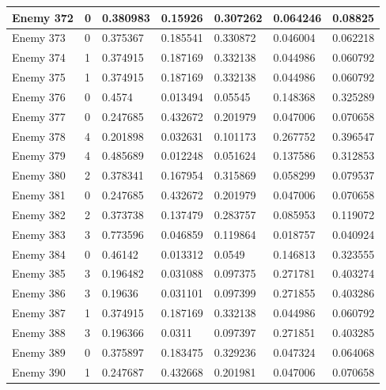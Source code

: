 \begin{longtable}{|l|l|l|l|l|l|l|}
	Enemy 372 & 0 & {\color[HTML]{009901} 0.380983} & 0.15926 & 0.307262 & 0.064246 & 0.08825 \\ \hline
	Enemy 373 & 0 & {\color[HTML]{009901} 0.375367} & 0.185541 & 0.330872 & 0.046004 & 0.062218 \\ \hline
	Enemy 374 & 1 & 0.374915 & {\color[HTML]{FE0000} 0.187169} & 0.332138 & 0.044986 & 0.060792 \\ \hline
	Enemy 375 & 1 & 0.374915 & {\color[HTML]{FE0000} 0.187169} & 0.332138 & 0.044986 & 0.060792 \\ \hline
	Enemy 376 & 0 & {\color[HTML]{009901} 0.4574} & 0.013494 & 0.05545 & 0.148368 & 0.325289 \\ \hline
	Enemy 377 & 0 & {\color[HTML]{FE0000} 0.247685} & 0.432672 & 0.201979 & 0.047006 & 0.070658 \\ \hline
	Enemy 378 & 4 & 0.201898 & 0.032631 & 0.101173 & 0.267752 & {\color[HTML]{009901} 0.396547} \\ \hline
	Enemy 379 & 4 & 0.485689 & 0.012248 & 0.051624 & 0.137586 & {\color[HTML]{FE0000} 0.312853} \\ \hline
	Enemy 380 & 2 & 0.378341 & 0.167954 & {\color[HTML]{FE0000} 0.315869} & 0.058299 & 0.079537 \\ \hline
	Enemy 381 & 0 & {\color[HTML]{FE0000} 0.247685} & 0.432672 & 0.201979 & 0.047006 & 0.070658 \\ \hline
	Enemy 382 & 2 & 0.373738 & 0.137479 & {\color[HTML]{FE0000} 0.283757} & 0.085953 & 0.119072 \\ \hline
	Enemy 383 & 3 & 0.773596 & 0.046859 & 0.119864 & {\color[HTML]{FE0000} 0.018757} & 0.040924 \\ \hline
	Enemy 384 & 0 & {\color[HTML]{009901} 0.46142} & 0.013312 & 0.0549 & 0.146813 & 0.323555 \\ \hline
	Enemy 385 & 3 & 0.196482 & 0.031088 & 0.097375 & {\color[HTML]{FE0000} 0.271781} & 0.403274 \\ \hline
	Enemy 386 & 3 & 0.19636 & 0.031101 & 0.097399 & {\color[HTML]{FE0000} 0.271855} & 0.403286 \\ \hline
	Enemy 387 & 1 & 0.374915 & {\color[HTML]{FE0000} 0.187169} & 0.332138 & 0.044986 & 0.060792 \\ \hline
	Enemy 388 & 3 & 0.196366 & 0.0311 & 0.097397 & {\color[HTML]{FE0000} 0.271851} & 0.403285 \\ \hline
	Enemy 389 & 0 & {\color[HTML]{009901} 0.375897} & 0.183475 & 0.329236 & 0.047324 & 0.064068 \\ \hline
	Enemy 390 & 1 & 0.247687 & {\color[HTML]{009901} 0.432668} & 0.201981 & 0.047006 & 0.070658 \\ \hline

\end{longtable}
